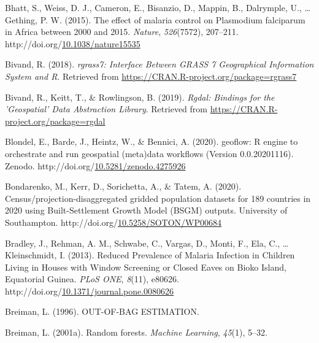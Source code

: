 \documentclass[12pt,twoside]{reedthesis}
\newlength{\cslhangindent}
\newenvironment{CSLReferences}[2] %
 {%
  \setlength{\parindent}{0pt}
  \ifodd #1 \everypar{\setlength{\hangindent}{\cslhangindent}}\ignorespaces\fi
  \ifnum #2 > 0
  \setlength{\parskip}{#2\baselineskip}
  \fi
 }%
 {}
\begin{document}
\begin{CSLReferences}{1}{0}
\leavevmode{}%
Bhatt, S., Weiss, D. J., Cameron, E., Bisanzio, D., Mappin, B., Dalrymple, U., \ldots{} Gething, P. W. (2015). The effect of malaria control on {Plasmodium} falciparum in {Africa} between 2000 and 2015. \emph{Nature}, \emph{526}(7572), 207--211. http://doi.org/\href{https://doi.org/10.1038/nature15535}{10.1038/nature15535}

\leavevmode{}%
Bivand, R. (2018). \emph{rgrass7: {Interface} {Between} {GRASS} 7 {Geographical} {Information} {System} and {R}}. Retrieved from \url{https://CRAN.R-project.org/package=rgrass7}

\leavevmode{}%
Bivand, R., Keitt, T., \& Rowlingson, B. (2019). \emph{Rgdal: {Bindings} for the '{Geospatial}' {Data} {Abstraction} {Library}}. Retrieved from \url{https://CRAN.R-project.org/package=rgdal}

\leavevmode{}%
Blondel, E., Barde, J., Heintz, W., \& Bennici, A. (2020). {geoflow: R engine to orchestrate and run geospatial (meta)data workflows} (Version 0.0.20201116). Zenodo. http://doi.org/\href{https://doi.org/10.5281/zenodo.4275926}{10.5281/zenodo.4275926}

\leavevmode{}%
Bondarenko, M., Kerr, D., Sorichetta, A., \& Tatem, A. (2020). Census/projection-disaggregated gridded population datasets for 189 countries in 2020 using {Built}-{Settlement} {Growth} {Model} ({BSGM}) outputs. University of Southampton. http://doi.org/\href{https://doi.org/10.5258/SOTON/WP00684}{10.5258/SOTON/WP00684}

\leavevmode{}%
Bradley, J., Rehman, A. M., Schwabe, C., Vargas, D., Monti, F., Ela, C., \ldots{} Kleinschmidt, I. (2013). Reduced {Prevalence} of {Malaria} {Infection} in {Children} {Living} in {Houses} with {Window} {Screening} or {Closed} {Eaves} on {Bioko} {Island}, {Equatorial} {Guinea}. \emph{PLoS ONE}, \emph{8}(11), e80626. http://doi.org/\href{https://doi.org/10.1371/journal.pone.0080626}{10.1371/journal.pone.0080626}

\leavevmode{}%
Breiman, L. (1996). OUT-OF-BAG ESTIMATION.

\leavevmode{}%
Breiman, L. (2001a). Random forests. \emph{Machine Learning}, \emph{45}(1), 5--32.


\end{CSLReferences}
\end{document}
